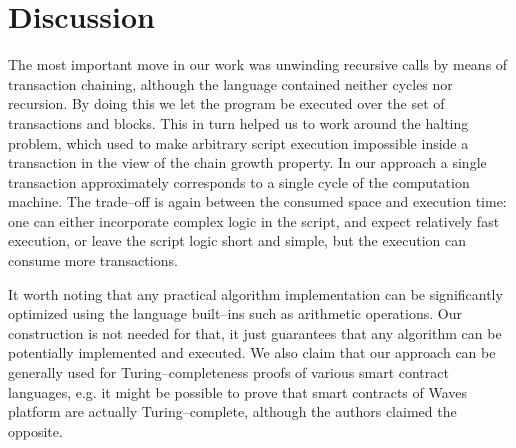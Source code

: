 \documentclass[runningheads]{llncs}
\begin{document}
    \section{Discussion}
    \label{section3}
    The most important move in our work was unwinding recursive calls by means
    of transaction chaining, although the language contained neither cycles nor
    recursion. By doing this we let the program be executed over the set of
    transactions and blocks. This in turn helped us to work around the halting
    problem, which used to make arbitrary script execution impossible inside a
    transaction in the view of the chain growth property. In our approach a single
    transaction approximately corresponds to a single cycle of the computation
    machine. The trade--off is again between the consumed space and execution
    time: one can either incorporate complex logic in the script, and expect
    relatively fast execution, or leave the script logic short and simple, but
    the execution can consume more transactions.

    It worth noting that any practical algorithm implementation can be
    significantly optimized using the language built--ins such as arithmetic
    operations. Our construction is not needed for that, it just
    guarantees that any algorithm can be potentially implemented and executed.
    We also claim that our approach can be generally used for Turing--completeness
    proofs of various smart contract languages, e.g. it might be possible to prove
    that smart contracts of Waves platform \cite{wavesSmarts} are actually
    Turing--complete, although the authors claimed the opposite.
\end{document}
